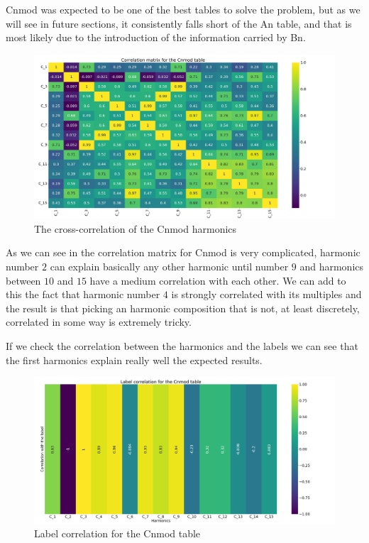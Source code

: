 Cnmod was expected to be one of the best tables to solve the problem, but as we will see in future
sections, it consistently falls short of the An table, and that is most likely due to the
introduction of the information carried by Bn.
\begin{figure}[h!]
	\centering
	\includegraphics[scale=.2]{img/Cnmod_corr_matrix.png}
	\caption{The cross-correlation of the Cnmod harmonics} \label{fig:cnmod-corr}
\end{figure}

As we can see in  the correlation matrix for Cnmod is very complicated,
harmonic number $2$ can explain basically any other harmonic until number $9$ and harmonics between
$10$ and $15$ have a medium correlation with each other. We can add to this the fact that harmonic
number $4$ is strongly correlated with its multiples and the result is that picking an harmonic
composition that is not, at least discretely, correlated in some way is extremely tricky.

If we check the correlation between the harmonics and the labels  we can see
that the first harmonics explain really well the expected results.
\begin{figure}[h!]
	\centering
	\includegraphics[scale=.2]{img/Cnmod_label_corr.png}
	\caption{Label correlation for the Cnmod table} \label{fig:cnmod-lcorr}
\end{figure}

